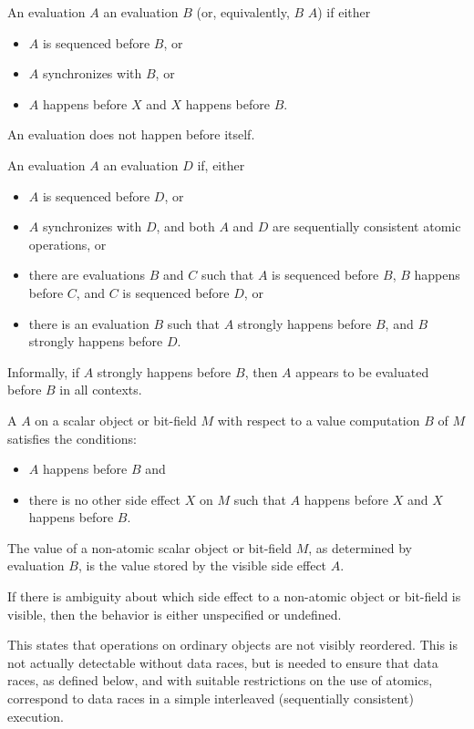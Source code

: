\pnum
An evaluation $A$  an evaluation $B$
(or, equivalently, $B$  $A$)
if either
\begin{itemize}
\item $A$ is sequenced before $B$, or
\item $A$ synchronizes with $B$, or
\item $A$ happens before $X$ and $X$ happens before $B$.
\end{itemize}
\begin{note}
An evaluation does not happen before itself.
\end{note}

\pnum
An evaluation $A$ 
an evaluation $D$ if, either
\begin{itemize}
\item $A$ is sequenced before $D$, or
\item $A$ synchronizes with $D$, and
both $A$ and $D$ are
sequentially consistent atomic operations, or
\item there are evaluations $B$ and $C$
such that $A$ is sequenced before $B$,
$B$ happens before $C$, and
$C$ is sequenced before $D$, or
\item there is an evaluation $B$ such that
$A$ strongly happens before $B$, and
$B$ strongly happens before $D$.
\end{itemize}
\begin{note}
Informally, if $A$ strongly happens before $B$,
then $A$ appears to be evaluated before $B$
in all contexts.
\end{note}

\pnum
A  $A$ on a scalar object or bit-field $M$
with respect to a value computation $B$ of $M$ satisfies the
conditions:
\begin{itemize}
\item $A$ happens before $B$ and
\item there is no other
%
side effect $X$ on $M$ such that $A$
happens before $X$ and $X$ happens before $B$.
\end{itemize}

The value of a non-atomic scalar object or bit-field $M$, as determined by
evaluation $B$, is the value stored by the
%
visible side effect $A$.
\begin{note}
If there is ambiguity about which side effect to a
non-atomic object or bit-field is visible, then the behavior is either
unspecified or undefined.
\end{note}
\begin{note}
This states that operations on
ordinary objects are not visibly reordered. This is not actually detectable
without data races, but is needed to ensure that data races, as defined
below, and with suitable restrictions on the use of atomics, correspond to data
races in a simple interleaved (sequentially consistent) execution.
\end{note}

